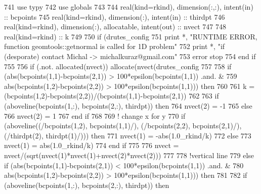 \begin{DoxyCode}
741     \textcolor{keywordtype}{use }typy
742     \textcolor{keywordtype}{use }globals
743     
744     \textcolor{keywordtype}{real(kind=rkind)}, \textcolor{keywordtype}{dimension(:,:)}, \textcolor{keywordtype}{intent(in)} :: bcpoints
745     \textcolor{keywordtype}{real(kind=rkind)}, \textcolor{keywordtype}{dimension(:)}, \textcolor{keywordtype}{intent(in)} :: thirdpt
746     \textcolor{keywordtype}{real(kind=rkind)}, \textcolor{keywordtype}{dimension(:)}, \textcolor{keywordtype}{allocatable}, \textcolor{keywordtype}{intent(out)} :: nvect
747     
748     \textcolor{keywordtype}{real(kind=rkind)} :: k
749     
750     \textcolor{keywordflow}{if} (drutes_config%
751       print *, \textcolor{stringliteral}{"RUNTIME ERROR, function geomtools::getnormal is called for 1D problem"}
752       print *, \textcolor{stringliteral}{"if (desporate) contact Michal -> michalkuraz@gmail.com"}
753       error stop
754 \textcolor{keywordflow}{    end if}    
755     
756     \textcolor{keywordflow}{if} (.not. \textcolor{keyword}{allocated}(nvect)) \textcolor{keyword}{allocate}(nvect(drutes_config%
757   
758     \textcolor{keywordflow}{if} (abs(bcpoints(1,1)-bcpoints(2,1)) > 100*epsilon(bcpoints(1,1)) .and. &
759       abs(bcpoints(1,2)-bcpoints(2,2)) > 100*epsilon(bcpoints(1,1))) \textcolor{keywordflow}{then}
760      
761       k = (bcpoints(1,2)-bcpoints(2,2))/(bcpoints(1,1)-bcpoints(2,1))
762      
763       \textcolor{keywordflow}{if} (aboveline(bcpoints(1,:), bcpoints(2,:), thirdpt)) \textcolor{keywordflow}{then}
764         nvect(2) = -1
765       \textcolor{keywordflow}{else}
766         nvect(2) = 1
767 \textcolor{keywordflow}{      end if}
768       
769       \textcolor{comment}{! change x for y}
770       \textcolor{keywordflow}{if} (aboveline((/bcpoints(1,2), bcpoints(1,1)/), (/bcpoints(2,2), bcpoints(2,1)/), (/thirdpt(2), 
      thirdpt(1)/))) \textcolor{keywordflow}{then}
771         nvect(1) =  -abs(1.0\_rkind/k)
772       \textcolor{keywordflow}{else}
773         nvect(1) = abs(1.0\_rkind/k)
774 \textcolor{keywordflow}{      end if}
775       
776       nvect = nvect/(sqrt(nvect(1)*nvect(1)+nvect(2)*nvect(2)))
777      
778     \textcolor{comment}{!vertical line}
779     \textcolor{keywordflow}{else} \textcolor{keywordflow}{if} (abs(bcpoints(1,1)-bcpoints(2,1)) < 100*epsilon(bcpoints(1,1)) .and. &
780        abs(bcpoints(1,2)-bcpoints(2,2)) > 100*epsilon(bcpoints(1,1))) \textcolor{keywordflow}{then}
781        
782        \textcolor{keywordflow}{if} (aboveline(bcpoints(1,:), bcpoints(2,:), thirdpt)) \textcolor{keywordflow}{then}

\end{DoxyCode}
